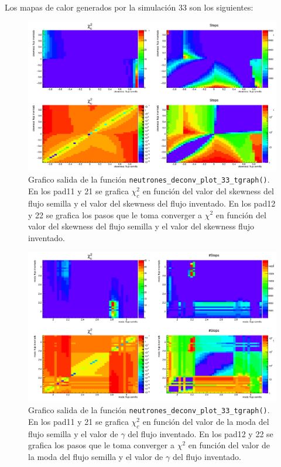 \documentclass[11pt,letterpaper]{article}
\begin{document}
Los mapas de calor generados por la simulación 33 son los siguientes:

 \begin{figure}[H]
    \includegraphics[width=1.\textwidth]{img/plot_deconv_33_tgraph_1.png}
    \centering
     \cprotect\caption{Grafico salida de la función \verb|neutrones_deconv_plot_33_tgraph()|. En los pad11 y 21 se grafica $\chi_c^2$ en función del valor del skewness del flujo semilla y el valor del skewness del flujo inventado.  En los pad12 y 22 se grafica los pasos que le toma converger a $\chi^2$  en función del valor del skewness del flujo semilla y el valor del skewness flujo inventado.} 
\label{plot_deconv_33_tgraph_skewness}
\end{figure}

 \begin{figure}[H]
    \includegraphics[width=1.\textwidth]{img/plot_deconv_33_tgraph_2.png}
    \centering
     \cprotect\caption{Grafico salida de la función \verb|neutrones_deconv_plot_33_tgraph()|. En los pad11 y 21 se grafica $\chi_c^2$ en función del valor de la moda del flujo semilla y el valor de $\gamma$ del flujo inventado.  En los pad12 y 22 se grafica los pasos que le toma converger a $\chi^2$  en función del valor de la moda del flujo semilla y el valor de $\gamma$ del flujo inventado.} 
\label{plot_deconv_33_tgraph_moda}
\end{figure}
\end{document}
